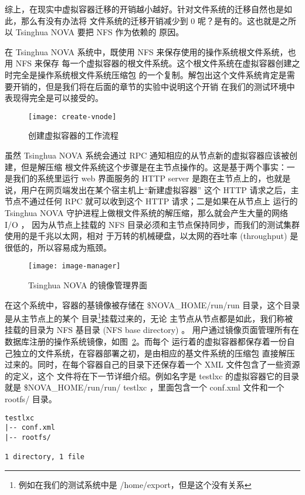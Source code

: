 综上，在现实中虚拟容器迁移的开销越小越好。针对文件系统的迁移自然也是如此，那么有没有办法将
文件系统的迁移开销减少到 0 呢？是有的。这也就是之所以 Tsinghua NOVA 要把 NFS 作为依赖的
原因。

在 Tsinghua NOVA 系统中，既使用 NFS 来保存使用的操作系统根文件系统，也用 NFS 来保存
每一个虚拟容器的根文件系统。这个根文件系统在虚拟容器创建之时完全是操作系统根文件系统压缩包
的一个复制。解包出这个文件系统肯定是需要开销的，但是我们将在后面的章节的实验中说明这个开销
在我们的测试环境中表现得完全是可以接受的。

\begin{figure}[t]
    \centering
    \texttt{[image: create-vnode]}
    \caption{创建虚拟容器的工作流程}
    \label{fig:create-vnode}
\end{figure}

虽然 Tsinghua NOVA 系统会通过 RPC 通知相应的从节点新的虚拟容器应该被创建，但是解压缩
根文件系统这个步骤是在主节点操作的。这是基于两个事实：一是我们的系统里运行 web 界面服务的
HTTP server 是跑在主节点上的，也就是说，用户在网页端发出在某个宿主机上“新建虚拟容器”
这个 HTTP 请求之后，主节点不通过任何 RPC 就可以收到这个 HTTP 请求；二是如果在从节点上
运行的 Tsinghua NOVA 守护进程上做根文件系统的解压缩，那么就会产生大量的网络 I/O ，
因为从节点上挂载的 NFS 目录必须和主节点保持同步，而我们的测试集群使用的是千兆以太网，相对
于万转的机械硬盘，以太网的吞吐率 (throughput) 是很低的，所以容易成为瓶颈。

\begin{figure}[H]
    \centering
    \texttt{[image: image-manager]}
    \caption{Tsinghua NOVA 的镜像管理界面}
    \label{fig:image-manager}
\end{figure}

在这个系统中，容器的基镜像被存储在 \$NOVA\_HOME/run/run 目录，这个目录是从主节点上的某个
目录\footnote{例如在我们的测试系统中是 /home/export，但是这个没有关系}挂载过来的，无论
主节点从节点都是如此，我们称被挂载的目录为 NFS 基目录 (NFS base directory) 。
用户通过镜像页面管理所有在数据库注册的操作系统镜像，如图~\ref{fig:image-manager}。而每个
运行着的虚拟容器都保存着一份自己独立的文件系统，在容器部署之初，是由相应的基文件系统的压缩包
直接解压过来的。同时，在每个容器自己的目录下还保存着一个 XML 文件包含了一些资源的定义，这个
文件将在下一节详细介绍。例如名字是 testlxc 的虚拟容器它的目录就是 \$NOVA\_HOME/run/run/
testlxc ，里面包含一个 conf.xml 文件和一个 rootfs/ 目录。

\begin{lstlisting}
testlxc
|-- conf.xml
|-- rootfs/

1 directory, 1 file
\end{lstlisting}

